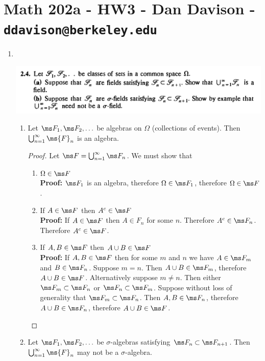 \section*{Math 202a - HW3 - Dan Davison - \texttt{ddavison@berkeley.edu}}

\begin{enumerate}
\item~\\
  \begin{mdframed}
    \includegraphics[width=400pt]{img/analysis--berkeley-202a-hw-e32d.png}
  \end{mdframed}
  \begin{enumerate}[label=(\alph*)]
  \item
    \begin{claim*}
      Let $\ms F_1, \ms F_2, \ldots$ be algebras on $\Omega$ (collections of events).
      Then $\bigcup_{n=1}^\infty \ms{F}_n$ is an algebra.
    \end{claim*}

    \begin{proof}
      Let $\ms F = \bigcup_{n=1}^\infty \ms F_n$. We must show that
      \begin{enumerate}
      \item $\Omega \in \ms F$ \\
        {\bf Proof:} $\ms F_1$ is an algebra, therefore $\Omega \in \ms F_1$, therefore $\Omega \in \ms F$.
      \item If $A \in \ms F$ then $A^c \in \ms F$ \\
        {\bf Proof:} If $A \in \ms F$ then $A \in F_n$ for some $n$. Therefore $A^c \in \ms F_n$. Therefore $A^c \in \ms F$.
      \item If $A, B \in \ms F$ then $A \cup B \in \ms F$ \\
        {\bf Proof:} If $A, B \in \ms F$ then for some $m$ and $n$ we have $A \in \ms F_m$ and $B \in \ms F_n$.
        Suppose $m = n$. Then $A \cup B \in \ms F_m$, therefore $A \cup B \in \ms F$. Alternatively
        suppose $m \neq n$. Then either $\ms F_m \subset \ms F_n$ or $\ms F_n \subset \ms F_m$. Suppose without
        loss of generality that $\ms F_m \subset \ms F_n$. Then $A, B \in \ms F_n$,
        therefore $A \cup B \in \ms F_n$, therefore $A \cup B \in \ms F$.
      \end{enumerate}
    \end{proof}
  \item
    \begin{claim*}
      Let $\ms F_1, \ms F_2, \ldots$ be $\sigma$-algebras satisfying $\ms F_n \subset \ms F_{n+1}$.
      Then $\bigcup_{n=1}^\infty \ms{F}_n$ may not be a $\sigma$-algebra.
    \end{claim*}


\end{enumerate}
\end{enumerate}
